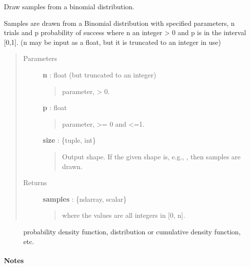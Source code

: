 \documentclass[letterpaper,10pt,english]{sphinxmanual}
\begin{document}
\begin{fulllineitems}
\label{index:halla.stats.binomial}
Draw samples from a binomial distribution.

Samples are drawn from a Binomial distribution with specified
parameters, n trials and p probability of success where
n an integer \textgreater{} 0 and p is in the interval {[}0,1{]}. (n may be
input as a float, but it is truncated to an integer in use)
\begin{quote}\begin{description}
\item[{Parameters}] \leavevmode
\textbf{n} : float (but truncated to an integer)
\begin{quote}

parameter, \textgreater{} 0.
\end{quote}

\textbf{p} : float
\begin{quote}

parameter, \textgreater{}= 0 and \textless{}=1.
\end{quote}

\textbf{size} : \{tuple, int\}
\begin{quote}

Output shape.  If the given shape is, e.g., , then
 samples are drawn.
\end{quote}

\item[{Returns}] \leavevmode
\textbf{samples} : \{ndarray, scalar\}
\begin{quote}

where the values are all integers in  {[}0, n{]}.
\end{quote}

\end{description}\end{quote}



\begin{description}
\item[{}] \leavevmode
probability density function, distribution or cumulative density function, etc.

\end{description}


\paragraph{Notes}


\end{fulllineitems}
\end{document}
